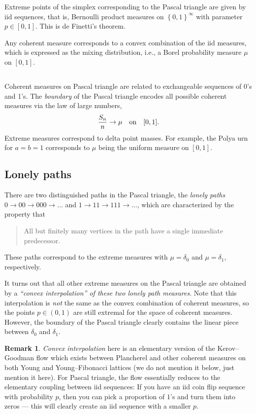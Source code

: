 \documentclass[letterpaper,11pt,oneside,reqno]{article}
\numberwithin{equation}{section}
\theoremstyle{definition}
\newtheorem{remark}[proposition]{Remark}
\begin{document}
Extreme points of the simplex corresponding to the Pascal triangle
are given by iid sequences,
that is, Bernoulli product measures on $\left\{ 0,1 \right\}^\infty$ with
parameter $p\in[0,1]$.
This is de Finetti's theorem.

Any coherent measure corresponds to a convex combination of the iid measures,
which is expressed as the mixing distribution, i.e., a Borel
probability measure $\mu$ on $[0,1]$.

\subsection{}

Coherent measures on Pascal triangle are related to exchangeable
sequences of 0's and 1's. The \emph{boundary} of the Pascal
triangle encodes all possible coherent measures via the law of large numbers,
\begin{equation*}
	\frac{S_n}{n}\to \mu \quad \textnormal{on} \quad [0,1].
\end{equation*}
Extreme measures correspond to delta point masses.
For example, the Polya urn for $a=b=1$ corresponds to $\mu$ being the
uniform measure on $[0,1]$.

\subsection{Lonely paths}

There are two distinguished paths in the Pascal triangle, the
\emph{lonely paths} $0\to00\to000\to\ldots $
and
$1\to 11\to111\to\ldots $, which are characterized by the
property that \cite{KerovGoodman1997}
\begin{quote}
	All but finitely many vertices in the path have a single immediate predecessor.
\end{quote}
These paths correspond to the extreme measures
with $\mu=\delta_0$ and $\mu=\delta_1$, respectively.

It turns out that all other extreme measures on the Pascal triangle
are obtained by a \emph{``convex interpolation'' of these two lonely path measures}.
Note that this interpolation is \emph{not} the same as the convex combination
of coherent measures, so the points $p\in(0,1)$ are still extremal
for the space of coherent measures. However, the boundary
of the Pascal triangle clearly contains the linear
piece between $\delta_0$ and $\delta_1$.

\begin{remark}
	\emph{Convex interpolation} here is an elementary version of the 
	Kerov--Goodman flow \cite{KerovGoodman1997}
	which exists between Plancherel and other coherent measures on both 
	Young and Young--Fibonacci lattices (we do not mention it below, just mention it here).
	For Pascal triangle, the flow essentially reduces to the elementary coupling between iid sequences:
	If you have an iid coin flip sequence with probability $p$, then you can pick a proportion of $1$'s and turn them
	into zeros --- this will clearly create an iid sequence with a smaller $p$.
\end{remark}
\end{document}
